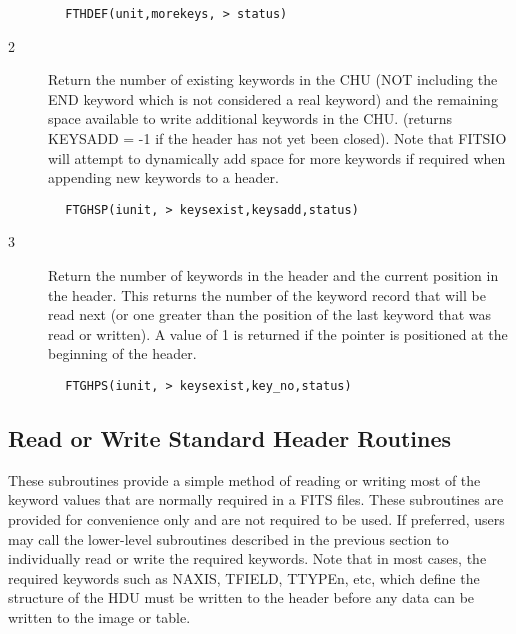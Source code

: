 \documentclass[11pt]{book}
\begin{document}
\begin{verbatim}
        FTHDEF(unit,morekeys, > status)
\end{verbatim}

\begin{description}
\item[2 ] Return the number of existing keywords in the CHU (NOT including the
    END keyword which is not considered a real keyword) and the remaining
    space available to write additional keywords in the CHU.  (returns
    KEYSADD = -1 if the header has not yet been closed).
    Note that FITSIO will attempt to dynamically add space for more
   keywords if required when appending new keywords to a header.
\end{description}

\begin{verbatim}
        FTGHSP(iunit, > keysexist,keysadd,status)
\end{verbatim}

\begin{description}
\item[3 ] Return the number of keywords in the header and the current position
    in the header.  This returns the number of the keyword record that
    will be read next (or one greater than the position of the last keyword
    that was read or written). A value of 1 is returned if the pointer is
   positioned at the beginning of the header.
\end{description}

\begin{verbatim}
        FTGHPS(iunit, > keysexist,key_no,status)
\end{verbatim}

\subsection{Read or Write Standard Header Routines \label{FTPHPR}}

These subroutines provide a simple method of reading or writing most of
the keyword values that are normally required in a FITS files.  These
subroutines are provided for convenience only and are not required to
be used.  If preferred, users may call the lower-level subroutines
described in the previous section to individually read or write the
required keywords.  Note that in most cases, the required keywords such
as NAXIS, TFIELD, TTYPEn, etc, which define the structure of the HDU
must be written to the header before any data can be written to the
image or table.
\end{document}
